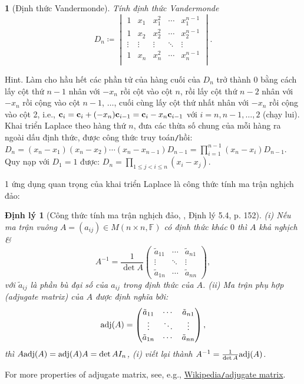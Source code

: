 \documentclass{article}
\newtheorem{baitoan}{}
\newtheorem{dinhly}{Định lý}
\begin{document}
\begin{baitoan}[Định thức Vandermonde]
	Tính định thức Vandermonde
	\begin{equation*}
		D_n\coloneqq\begin{vmatrix}
			1 & x_1 & x_1^2 & \cdots & x_1^{n-1}\\
			1 & x_2 & x_2^2 & \cdots & x_2^{n-1}\\
			\vdots & \vdots & \vdots & \ddots & \vdots\\
			1 & x_n & x_n^2 & \cdots & x_n^{n-1}\\
		\end{vmatrix}.
	\end{equation*}
\end{baitoan}
{\sf Hint.} Làm cho hầu hết các phần tử của hàng cuối của $D_n$ trở thành 0 bằng cách lấy cột thứ $n - 1$ nhân với $-x_n$ rồi cột vào cột $n$, rồi lấy cột thứ $n - 2$ nhân với $-x_n$ rồi cộng vào cột $n - 1$, $\ldots$, cuối cùng lấy cột thứ nhất nhân với $-x_n$ rồi cộng vào cột 2, i.e., ${\bf c}_i = {\bf c}_i + (-x_n){\bf c}_{i-1} = {\bf c}_i - x_n{\bf c}_{i-1}$ với $i = n,n - 1,\ldots,2$ (chạy lui). Khai triển Laplace theo hàng thứ $n$, đưa các thừa số chung của mỗi hàng ra ngoài dấu định thức, được công thức truy toán{\tt/}hồi: $D_n = (x_n - x_1)(x_n - x_2)\cdots(x_n - x_{n-1})D_{n-1} = \prod_{i=1}^{n-1} (x_n - x_i)D_{n-1}$. Quy nạp với $D_1 = 1$ được: $D_n = \prod_{1\le j < i\le n} (x_i - x_j)$.

1 ứng dụng quan trọng của khai triển Laplace là công thức tính ma trận nghịch đảo:

\begin{dinhly}[Công thức tính ma trận nghịch đảo, \cite{Hung_linear_algebra}, Định lý 5.4, p. 152]
	(i) Nếu ma trận vuông $A = (a_{ij})\in M(n\times n,\mathbb{F})$ có định thức khác $0$ thì $A$ khả nghịch \&
	\begin{equation*}
		A^{-1} = \frac{1}{\det A}\begin{pmatrix}
			\tilde{a}_{11} & \cdots & \tilde{a}_{n1}\\\vdots & \ddots & \vdots\\\tilde{a}_{1n} & \cdots & \tilde{a}_{nn}
		\end{pmatrix},
	\end{equation*}
	với $\tilde{a}_{ij}$ là phần bù đại số của $a_{ij}$ trong định thức của $A$. (ii) {\rm Ma trận phụ hợp} (adjugate matrix) của $A$ được định nghĩa bởi:
	\begin{equation*}
		{\rm adj}(A) = \begin{pmatrix}
			\tilde{a}_{11} & \cdots & \tilde{a}_{n1}\\\vdots & \ddots & \vdots\\\tilde{a}_{1n} & \cdots & \tilde{a}_{nn}
		\end{pmatrix},
	\end{equation*}
	thì $A{\rm adj}(A) = {\rm adj}(A)A = \det A I_n$, (i) viết lại thành $A^{-1} = \frac{1}{\det A}{\rm adj}(A)$.
\end{dinhly}
For more properties of adjugate matrix, see, e.g., \href{https://en.wikipedia.org/wiki/Adjugate_matrix}{Wikipedia{\tt/}adjugate matrix}.
\end{document}
